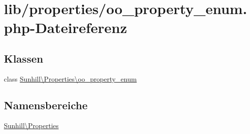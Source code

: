 \hypertarget{oo__property__enum_8php}{}\section{lib/properties/oo\+\_\+property\+\_\+enum.php-\/\+Dateireferenz}
\label{oo__property__enum_8php}
\subsection*{Klassen}
\begin{DoxyCompactItemize}
\item 
class \hyperlink{classSunhill_1_1Properties_1_1oo__property__enum}{Sunhill\textbackslash{}\+Properties\textbackslash{}oo\+\_\+property\+\_\+enum}
\end{DoxyCompactItemize}
\subsection*{Namensbereiche}
\begin{DoxyCompactItemize}
\item 
 \hyperlink{namespaceSunhill_1_1Properties}{Sunhill\textbackslash{}\+Properties}
\end{DoxyCompactItemize}
